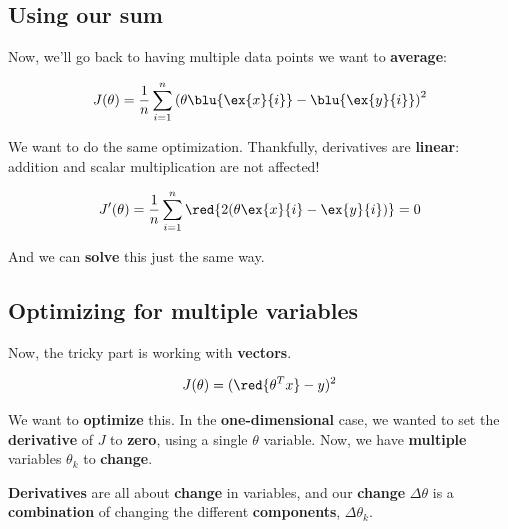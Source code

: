         
    \subsection{Using our sum}
    
        Now, we'll go back to having multiple data points we want to \textbf{average}:
        
        \begin{equation}
            J(\theta) = \frac{1}{n}  \sum_{i=1}^n 
            \left( \theta \blu{\ex{x}{i}}  
            - \blu{\ex{y}{i}} \right)^2 
        \end{equation}
        
        We want to do the same optimization. Thankfully, derivatives are \textbf{linear}: addition and scalar multiplication are not affected!
        
        \begin{equation}
            J'(\theta) = \frac{1}{n}  \sum_{i=1}^n \red{2(\theta \ex{x}{i}  
            - \ex{y}{i} )} = 0
        \end{equation}
        
        And we can \textbf{solve} this just the same way.
        
    \subsection{Optimizing for multiple variables}
    
        Now, the tricky part is working with \textbf{vectors}.
        
        \begin{equation}
            J(\theta) = (\red{ \theta^T x  } - y )^2
        \end{equation}
        
        We want to \textbf{optimize} this. In the \textbf{one-dimensional} case, we wanted to set the \textbf{derivative} of $J$ to \textbf{zero}, using a single $\theta$ variable. Now, we have \textbf{multiple} variables $\theta_k$ to \textbf{change}.
        
        \textbf{Derivatives} are all about \textbf{change} in variables, and our \textbf{change} $\Delta \theta$ is a \textbf{combination} of changing the different \textbf{components}, $\Delta \theta_k$. 
        
